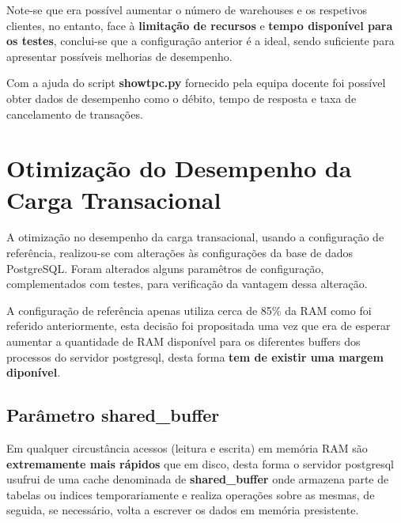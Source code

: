 \hspace{5mm} Note-se que era possível aumentar o número de warehouses e os respetivos clientes, no entanto, face à \textbf{limitação de recursos} e \textbf{tempo disponível para os testes}, conclui-se que a configuração anterior é a ideal, sendo suficiente para apresentar possíveis melhorias de desempenho.

\hspace{5mm} Com a ajuda do script \textbf{showtpc.py} fornecido pela equipa docente foi possível obter dados de desempenho como o débito, tempo de resposta e taxa de cancelamento de transações.

\newpage
\section{Otimização do Desempenho da Carga Transacional} \label{sec:refOpti}

\hspace{5mm} A otimização no desempenho da carga transacional, usando a configuração de referência, realizou-se com alterações às configurações da base de dados PostgreSQL. Foram alterados alguns paramêtros de configuração, complementados com testes, para verificação da vantagem dessa alteração.

\hspace{5mm}A configuração de referência apenas utiliza cerca de 85\% da RAM como foi referido anteriormente, esta decisão foi propositada uma vez que era de esperar aumentar a quantidade de RAM disponível para os diferentes buffers dos processos do servidor postgresql, desta forma \textbf{tem de existir uma margem diponível}.


\subsection{Parâmetro shared\_buffer}

Em qualquer circustância acessos (leitura e escrita) em memória RAM são \textbf{extremamente mais rápidos} que em disco, desta forma o servidor postgresql usufrui de uma cache denominada de \textbf{shared\_buffer} onde armazena parte de tabelas ou indices temporariamente e realiza operações sobre as mesmas, de seguida, se necessário, volta a escrever os dados em memória presistente.

